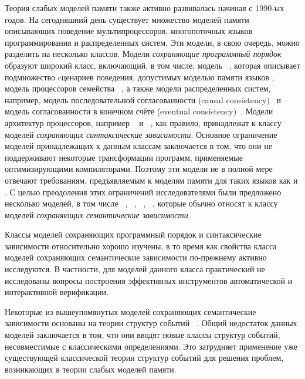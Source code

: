 Теория слабых моделей памяти также активно развивалась начиная с 1990-ых годов. 
На сегодняшний день существует множество моделей памяти 
описывающих поведение мультипроцессоров, 
многопоточных языков программирования и распределенных систем. 
Эти модели, в свою очередь, можно разделить на несколько классов. 
Модели \emph{сохраняющие программный порядок} образуют широкий класс, 
включающий, в том числе, модель \RCMM~\autocite{Lahav-al:PLDI17},
которая описывает подмножество cценариев поведения, допустимых моделью памяти языков \CPP,
модель \TSO процессоров семейства \Intel~\autocite{Sewell-al:CACM10},
а также модели распределенных систем, 
например, модель последовательной согласованности (causal consistency)~\autocite{Lahav-Boker:PLDI2020}
и модель согласованности в конечном счёте (eventual consistency)~\autocite{Jagadeesan-al:ESOP2018}.
Модели архитектур процессоров, например ~\autocite{Pulte-al:POPL18} 
и \POWER~\autocite{Sarkar-al:PLDI11}, 
как правило, принадлежат к классу моделей \emph{сохраняющих синтаксические зависимости}. 
Основное ограничение моделей принадлежащих к данным классам заключается в том, 
что они не поддерживают некоторые трансформации программ, 
применяемые оптимизирующими компиляторами. 
Поэтому эти модели не в полной мере отвечают требованиям, 
предъявляемым к моделям памяти для таких языков как \CPP и \Java. 
С целью преодоления этих ограничений исследователями 
были предложено несколько моделей, в том числе 
\Prm~\autocite{Kang-al:POPL17}, \Wkm~\autocite{Chakraborty-Vafeiadis:POPL19}, 
\MRD~\autocite{Paviotti-al:ESOP20}, \PwP~\autocite{Jagadeesan-al:OOPSLA2020},
которые обычно относят к классу моделей \emph{сохраняющих семантические зависимости}.

Классы моделей сохраняющих программный порядок и синтаксические зависимости 
относительно хорошо изучены, в то время как свойства класса моделей 
сохраняющих семантические зависимости по-прежнему активно исследуются.
В частности, для моделей данного класса практический не исследованы
вопросы построения эффективных инструментов автоматической и интерактивной верификации. 

Некоторые из вышеупомянутых моделей сохраняющих семантические зависимости
основаны на теории структур событий%
~\autocite{Jeffrey-Riely:LICS16,PichonPharabod-Sewell:POPL16,
Chakraborty-Vafeiadis:POPL19,Paviotti-al:ESOP20}.
Общий недостаток данных моделей заключается в том,
что они вводят новые классы структур событий, 
несовместимые с классическими определениями.
Это затрудняет применение уже существующей классической теории структур событий
для решения проблем, возникающих в теории слабых моделей памяти. 

